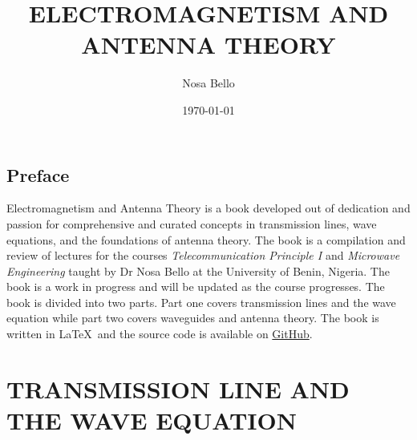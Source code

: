 \documentclass[a4paper,10pt, two column]{book}
\begin{document}
\author{Nosa Bello}
\title{ELECTROMAGNETISM AND ANTENNA THEORY}
\date{\today}

\frontmatter
\maketitle
\tableofcontents

\chapter{Preface}
Electromagnetism and Antenna Theory is a book developed out of dedication and passion for comprehensive and curated concepts in transmission lines, wave equations, and the foundations of antenna theory. The book is a compilation and review of lectures for the courses \textit{Telecommunication Principle I} and \textit{Microwave Engineering} taught by Dr Nosa Bello at the University of Benin, Nigeria. The book is a work in progress and will be updated as the course progresses. The book is divided into two parts. Part one covers transmission lines and the wave equation while part two covers waveguides and antenna theory. The book is written in \LaTeX\ and the source code is available on \href{https://github.com/allisonoge/electromagnetism-and-antenna-theory-v2.git}{GitHub}.

\mainmatter

\part{TRANSMISSION LINE AND THE WAVE EQUATION}
















\end{document}
